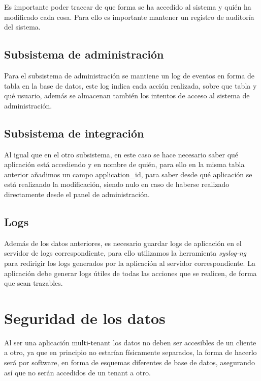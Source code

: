 \documentclass[12pt,a4paperpaper,]{report}
\begin{document}
Es importante poder tracear de que forma se ha accedido al sistema y
quién ha modificado cada cosa. Para ello es importante mantener un
registro de auditoría del sistema.

\subsection{Subsistema de
administración}\label{subsistema-de-administraciuxf3n-1}

Para el subsistema de administración se mantiene un log de eventos en
forma de tabla en la base de datos, este log indica cada acción
realizada, sobre que tabla y qué usuario, además se almacenan también
los intentos de acceso al sistema de administración.

\subsection{Subsistema de
integración}\label{subsistema-de-integraciuxf3n-1}

Al igual que en el otro subsistema, en este caso se hace necesario saber
qué aplicación está accediendo y en nombre de quién, para ello en la
misma tabla anterior añadimos un campo application\_id, para saber desde
qué aplicación se está realizando la modificación, siendo nulo en caso
de haberse realizado directamente desde el panel de administración.

\subsection{Logs}\label{logs}

Además de los datos anteriores, es necesario guardar logs de aplicación
en el servidor de logs correspondiente, para ello utilizamos la
herramienta \emph{syslog-ng} para redirigir los logs generados por la
aplicación al servidor correspondiente. La aplicación debe generar logs
útiles de todas las acciones que se realicen, de forma que sean
trazables.

\section{Seguridad de los datos}\label{seguridad-de-los-datos}

Al ser una aplicación multi-tenant los datos no deben ser accesibles de
un cliente a otro, ya que en principio no estarían físicamente
separados, la forma de hacerlo será por software, en forma de esquemas
diferentes de base de datos, asegurando así que no serán accedidos de un
tenant a otro.
\end{document}
